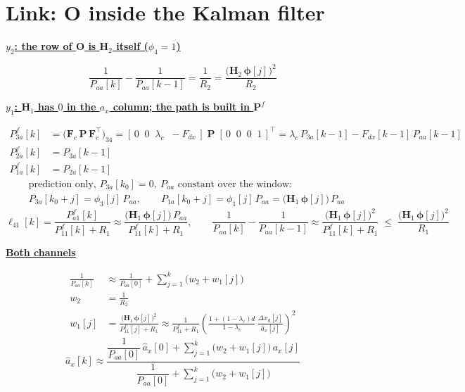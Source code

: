 \documentclass[11pt,a4paper]{ctexart}
\newcommand{\lc}{\lambda_c}
\newcommand{\hd}[1]{\par\medskip\noindent\underline{\textbf{#1}}\par\nobreak\vspace{0.2ex}}
\begin{document}
\section{Link: $\mathbf{O}$ inside the Kalman filter}

\hd{$y_2$: the row of $\mathbf{O}$ is $\mathbf{H}_2$ itself ($\phi_4 = 1$)}
\[
\frac{1}{P_{aa}[k]} - \frac{1}{P_{aa}[k-1]} = \frac{1}{R_2} = \frac{\big(\mathbf{H}_2\,\bm{\phi}[j]\big)^2}{R_2}
\]

\hd{$y_1$: $\mathbf{H}_1$ has $0$ in the $a_x$ column; the path is built in $\mathbf{P}^f$}
\[
\begin{aligned}
P^f_{3a}[k] &= \big(\mathbf{F}_e\,\mathbf{P}\,\mathbf{F}_e^{\top}\big)_{34}
= [\,0\;\;0\;\;\lc\;\;-F_{dx}\,]\;\mathbf{P}\;[\,0\;\;0\;\;0\;\;1\,]^{\top} = \lc\,P_{3a}[k-1] - F_{dx}[k-1]\,P_{aa}[k-1] \\
P^f_{2a}[k] &= P_{3a}[k-1] \\
P^f_{1a}[k] &= P_{2a}[k-1]
\end{aligned}
\]
\[
\begin{aligned}
&\text{prediction only, } P_{3a}[k_0] = 0, \ P_{aa} \text{ constant over the window:} \\
&P_{3a}[k_0+j] = \phi_3[j]\,P_{aa}, \qquad P_{1a}[k_0+j] = \phi_1[j]\,P_{aa} = \big(\mathbf{H}_1\,\bm{\phi}[j]\big)\,P_{aa}
\end{aligned}
\]
\[
\ell_{41}[k] = \frac{P^f_{a1}[k]}{P^f_{11}[k] + R_1} \approx \frac{\big(\mathbf{H}_1\,\bm{\phi}[j]\big)\,P_{aa}}{P^f_{11}[k] + R_1}, \qquad
\frac{1}{P_{aa}[k]} - \frac{1}{P_{aa}[k-1]} \approx \frac{\big(\mathbf{H}_1\,\bm{\phi}[j]\big)^2}{P^f_{11}[k] + R_1}
\;\le\; \frac{\big(\mathbf{H}_1\,\bm{\phi}[j]\big)^2}{R_1}
\]

\hd{Both channels}
\[
\begin{aligned}
\frac{1}{P_{aa}[k]} &\approx \frac{1}{P_{aa}[0]} + \sum_{j=1}^{k}\big(w_2 + w_1[j]\big) \\
w_2 &= \frac{1}{R_2} \\
w_1[j] &= \frac{\big(\mathbf{H}_1\,\bm{\phi}[j]\big)^2}{P^f_{11}[j] + R_1} \approx \frac{1}{P^f_{11} + R_1}\left(\frac{1 + (1-\lc)d}{1-\lc}\,\frac{\Delta x_d[j]}{\hat a_x[j]}\right)^{2}
\end{aligned}
\]
\[
\hat a_x[k] \approx \frac{\dfrac{1}{P_{aa}[0]}\,\hat a_x[0] + \sum_{j=1}^{k}\big(w_2 + w_1[j]\big)\,a_x[j]}
{\dfrac{1}{P_{aa}[0]} + \sum_{j=1}^{k}\big(w_2 + w_1[j]\big)}
\]

\end{document}
